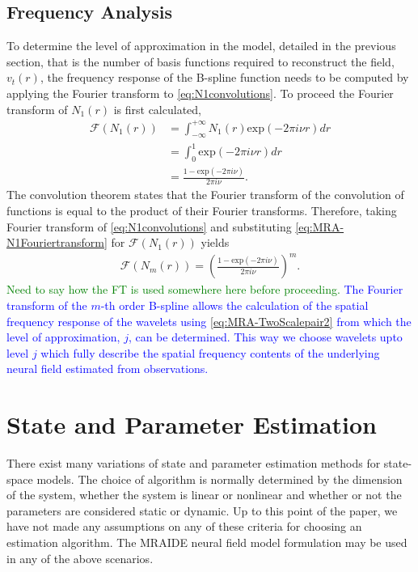 \documentclass[review,authoryear,3p]{elsarticle}
\newcommand{\dean}[1]{\textcolor{green}{#1}}
\newcommand{\parham}[1]{\textcolor{blue}{#1}}
\begin{document}
\subsection{Frequency Analysis}
To determine the level of approximation in the model, detailed in the previous section, that is the number of basis functions required to reconstruct the field, $v_t(r)$, the frequency response of the B-spline function needs to be computed by applying the Fourier transform to \eqref{eq:N1convolutions}. To proceed the Fourier transform of $N_1(r)$ is first calculated, 
\begin{align}\label{eq:MRA-N1Fouriertransform}
\mathcal F(N_1(r))&=\int_{-\infty}^{+\infty}N_1(r)\mathrm{exp}(-2\pi i \nu r)dr \nonumber \\
&=\int_{0}^{1} \mathrm{exp}(-2\pi i \nu r)dr \nonumber \\
&=\frac{1-\mathrm{exp}(-2\pi i \nu)}{2\pi i\nu}.
\end{align}
The convolution theorem states that the Fourier transform of the convolution of functions is equal to the product of their Fourier transforms. Therefore, taking Fourier transform of \eqref{eq:N1convolutions} and substituting \eqref{eq:MRA-N1Fouriertransform} for $\mathcal F(N_1(r)) $ yields
\begin{align}\label{eq:MRA-NmFouriertransform}
\mathcal F(N_m(r))=\left(\frac{1-\mathrm{exp}(-2\pi i \nu)}{2\pi i\nu}\right)^m.
\end{align}
\dean{Need to say how the FT is used somewhere here before proceeding.} \parham{The Fourier transform of the $m$-th order B-spline allows the calculation of the spatial frequency response of the wavelets using \eqref{eq:MRA-TwoScalepair2} from which the level of approximation, $j$, can be determined. This way we choose wavelets upto level $j$ which fully describe the spatial frequency contents of the underlying neural field estimated from observations.}


\section{State and Parameter Estimation}
There exist many variations of state and parameter estimation methods for state-space models. The choice of algorithm is normally determined by the dimension of the system, whether the system is linear or nonlinear and whether or not the parameters are considered static or dynamic. Up to this point of the paper, we have not made any assumptions on any of these criteria for choosing an estimation algorithm. The MRAIDE neural field model formulation may be used in any of the above scenarios. 
\end{document}
